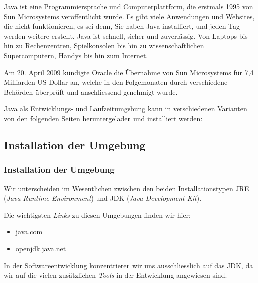 Java ist eine Programmiersprache und Computerplattform, die erstmals 1995 von
Sun Microsystems veröffentlicht wurde. Es gibt viele Anwendungen und
Websites, die nicht funktionieren, es sei denn, Sie haben Java installiert,
und jeden Tag werden weitere erstellt. Java ist schnell, sicher und
zuverlässig. Von Laptops bis hin zu Rechenzentren, Spielkonsolen bis hin zu
wissenschaftlichen Supercomputern, Handys bis hin zum Internet.

Am 20. April 2009 kündigte Oracle die Übernahme von Sun Microsystems für
7,4 Milliarden US-Dollar an, welche in den Folgemonaten durch verschiedene
Behörden überprüft und anschliessend genehmigt wurde.

Java als Entwicklungs- und Laufzeitumgebung kann in verschiedenen Varianten
von den folgenden Seiten heruntergeladen und installiert werden:


\subsection{Installation der Umgebung}
\label{subsec:installation}

\begin{frame}[fragile]
    \frametitle<presentation>{Installation der Umgebung}

    Wir unterscheiden im Wesentlichen zwischen den beiden Installationstypen
    JRE ({\em Java Runtime Environment}) und JDK ({\em Java
    Development Kit}).

    Die wichtigsten {\em Links} zu diesen Umgebungen finden wir hier:

    \begin{itemize}
        \item \href{https://java.com}{java.com}
        \item \href{https://openjdk.java.net}{openjdk.java.net}
    \end{itemize}

\end{frame}

In der Softwareentwicklung konzentrieren wir uns ausschliesslich auf das JDK,
da wir auf die vielen zusätzlichen {\em Tools} in der Entwicklung angewiesen
sind.


